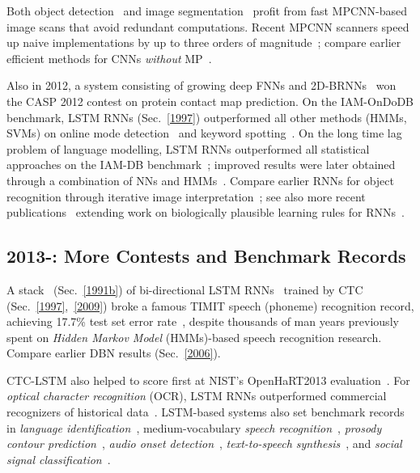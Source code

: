 \documentclass[letterpaper]{article}
\begin{document}
\begin{CJK*}{UTF8}{gbsn}
Both object detection~\citep{miccai2013}  and image segmentation~\citep{ciresan2012nips}  
profit from fast MPCNN-based image scans that avoid redundant computations.
Recent MPCNN scanners  
speed up naive implementations  by up to 
three orders of magnitude~\citep{masci:2013icip,Giusti:2013a};
compare earlier efficient methods for CNNs {\em without} MP~\citep{vaillant-monrocq-lecun-94}.

Also in 2012,
a system consisting of  growing deep FNNs and 
2D-BRNNs~\citep{baldi2012contact} won the CASP 2012 contest
on protein contact map prediction.
On the IAM-OnDoDB benchmark,
LSTM RNNs (Sec.~\ref{1997}) outperformed all other methods (HMMs, SVMs) on 
online mode detection~\citep{otte2012local,indermuhle2012mode}
and keyword spotting~\citep{indermuhle2011keyword}.
On the long time lag problem of language modelling, LSTM RNNs 
outperformed all statistical approaches on the IAM-DB benchmark~\citep{frinken2012long};
improved results were later obtained through a combination of NNs and HMMs~\citep{zamora2014}.
Compare earlier RNNs for object 
recognition through iterative image interpretation~\citep{Behnke:IJCNN1998,Behnke:ICANN2002,Behnke:LNCS};
see also more recent publications~\citep{wyatte2012b,oreilly2013} extending
work on biologically plausible learning rules for RNNs~\citep{oreilly1996}.



\subsection{2013-: More Contests and Benchmark Records}
\label{2013}

A stack~\citep{Santi:07ijcai,graves:2009nips} (Sec.~\ref{1991b}) of bi-directional LSTM 
RNNs~\citep{graves05nn}  
trained by CTC (Sec.~\ref{1997},~\ref{2009}) 
broke a famous TIMIT speech (phoneme) recognition record, achieving 17.7\% test set error rate~\citep{graves:2013icassp}, despite thousands of man years previously spent on {\em Hidden Markov Model} (HMMs)-based speech recognition research. 
Compare earlier DBN results (Sec.~\ref{2006}).

CTC-LSTM also 
helped to score first at NIST's OpenHaRT2013 evaluation~\citep{bluche13}.
For {\em optical character recognition} (OCR), LSTM RNNs outperformed commercial 
recognizers of historical data~\citep{breuel2013high}.
LSTM-based systems  also set benchmark records in
{\em language identification}~\citep{gonzalez2014},
medium-vocabulary {\em speech recognition}~\citep{geiger2014},
{\em prosody contour prediction}~\citep{fernandez2014},
{\em audio onset detection}~\citep{marchi2014},
{\em text-to-speech synthesis}~\citep{fan2014}, and
{\em social signal classification}~\citep{brueckner2014}.


\end{CJK*}
\end{document}
